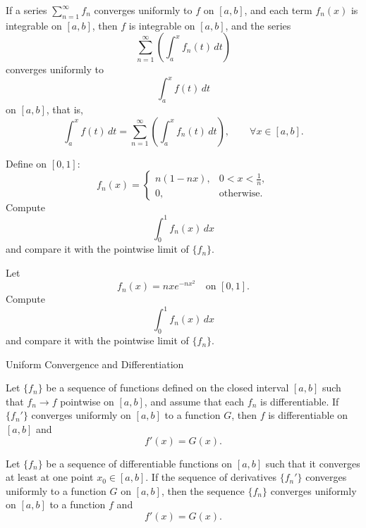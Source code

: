 \documentclass[12pt, a4paper]{article}
\begin{document}
\clearpage

\begin{theorem}
If a series $\sum_{n=1}^{\infty} f_n$ converges uniformly to $f$ on $[a,b]$, and each term
$f_n(x)$ is integrable on $[a,b]$, then $f$ is integrable on $[a,b]$, and the series
\[
\sum_{n=1}^{\infty}\left(\int_a^x f_n(t)\,dt\right)
\]
converges uniformly to
\[
\int_a^x f(t)\,dt
\]
on $[a,b]$, that is,
\[
\int_a^x f(t)\,dt
=
\sum_{n=1}^{\infty}\left(\int_a^x f_n(t)\,dt\right),
\qquad \forall x\in[a,b].
\]
\end{theorem}

\clearpage

\begin{problem}
Define on $[0,1]$:
\[
f_n(x)=
\begin{cases}
n(1-nx), & 0<x<\frac{1}{n},\\
0, & \text{otherwise}.
\end{cases}
\]
Compute
\[
\int_0^1 f_n(x)\,dx
\]
and compare it with the pointwise limit of $\{f_n\}$.
\end{problem}

\clearpage

\begin{problem}
Let
\[
f_n(x)=n x e^{-n x^2}
\quad \text{on } [0,1].
\]
Compute
\[
\int_0^1 f_n(x)\,dx
\]
and compare it with the pointwise limit of $\{f_n\}$.
\end{problem}


\clearpage

\begin{heading}
    Uniform Convergence and Differentiation
\end{heading}

\vspace{10pt}

\begin{theorem}
Let $\{f_n\}$ be a sequence of functions defined on the closed interval $[a,b]$
such that $f_n \to f$ pointwise on $[a,b]$, and assume that each $f_n$ is differentiable.
If $\{f_n'\}$ converges uniformly on $[a,b]$ to a function $G$, then $f$ is differentiable
on $[a,b]$ and
\[
f'(x)=G(x).
\]
\end{theorem}

\clearpage

\begin{theorem}
Let $\{f_n\}$ be a sequence of differentiable functions on $[a,b]$ such that it converges
at least at one point $x_0\in [a,b]$. If the sequence of derivatives $\{f_n'\}$ converges
uniformly to a function $G$ on $[a,b]$, then the sequence $\{f_n\}$ converges uniformly
on $[a,b]$ to a function $f$ and
\[
f'(x)=G(x).
\]
\end{theorem}
\end{document}
